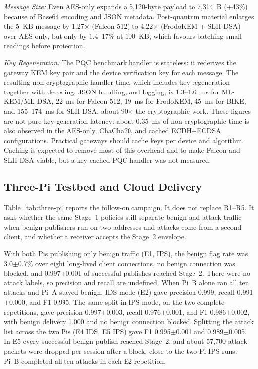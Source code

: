 \documentclass[journal]{IEEEtran}
\begin{document}
\textit{Message Size:} Even AES-only expands a 5,120-byte payload to 7,314~B (+43\%) because of Base64 encoding and JSON metadata. Post-quantum material enlarges the 5~KB message by 1.27$\times$ (Falcon-512) to 4.22$\times$ (FrodoKEM + SLH-DSA) over AES-only, but only by 1.4--17\% at 100~KB, which favours batching small readings before protection.

\textit{Key Regeneration:} The PQC benchmark handler is stateless: it rederives the gateway KEM key pair and the device verification key for each message. The resulting non-cryptographic handler time, which includes key regeneration together with decoding, JSON handling, and logging, is 1.3--1.6~ms for ML-KEM/ML-DSA, 22~ms for Falcon-512, 19~ms for FrodoKEM, 45~ms for BIKE, and 155--174~ms for SLH-DSA, about 90$\times$ the cryptographic work. These figures are not pure key-generation latency: about 0.35~ms of non-cryptographic time is also observed in the AES-only, ChaCha20, and cached ECDH+ECDSA configurations. Practical gateways should cache keys per device and algorithm. Caching is expected to remove most of this overhead and to make Falcon and SLH-DSA viable, but a key-cached PQC handler was not measured.

\subsection{Three-Pi Testbed and Cloud Delivery}
\label{sec:res-three-pi}

Table~\ref{tab:three-pi} reports the follow-on campaign. It does not replace R1--R5. It asks whether the same Stage~1 policies still separate benign and attack traffic when benign publishers run on two addresses and attacks come from a second client, and whether a receiver accepts the Stage~2 envelope.

With both Pis publishing only benign traffic (E1, IPS), the benign flag rate was 3.0$\pm$0.7\% over eight long-lived client connections, no benign connection was blocked, and 0.997$\pm$0.001 of successful publishes reached Stage~2. There were no attack labels, so precision and recall are undefined. When Pi~B alone ran all ten attacks and Pi~A stayed benign, IDS mode (E2) gave precision 0.999, recall 0.991$\pm$0.000, and F1 0.995. The same split in IPS mode, on the two complete repetitions, gave precision 0.997$\pm$0.003, recall 0.976$\pm$0.001, and F1 0.986$\pm$0.002, with benign delivery 1.000 and no benign connection blocked. Splitting the attack list across the two Pis (E4 IDS, E5 IPS) gave F1 0.995$\pm$0.001 and 0.989$\pm$0.005. In E5 every successful benign publish reached Stage~2, and about 57,700 attack packets were dropped per session after a block, close to the two-Pi IPS runs. Pi~B completed all ten attacks in each E2 repetition.
\end{document}
